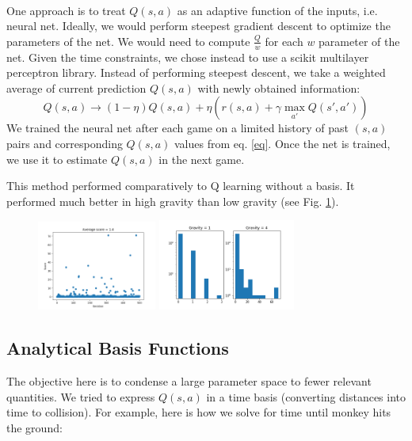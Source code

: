 \documentclass[11pt]{article}
\begin{document}
\paragraph{}One approach is to treat $Q(s,a)$ as an adaptive function of the inputs, i.e. neural net. Ideally, we would perform steepest gradient descent to optimize the parameters of the net. We would need to compute $\frac{Q}{w}$ for each $w$ parameter of the net. Given the time constraints, we chose instead to use a scikit multilayer perceptron library. Instead of performing steepest descent, we take a weighted average of current prediction $Q(s,a)$ with newly obtained information:
\begin{equation}Q(s,a)\rightarrow(1-\eta)Q(s,a)+\eta(r(s,a)+\gamma\max_{a'}Q(s',a'))\label{eq}\end{equation}
We trained the neural net after each game on a limited history of past $(s,a)$ pairs and corresponding $Q(s,a)$ values from eq. \ref{eq}. Once the net is trained, we use it to estimate $Q(s,a)$ in the next game.

This method performed comparatively to Q learning without a basis. It performed much better in high gravity than low gravity (see Fig. \ref{nn}).

\begin{figure}[] 
\centering
        \includegraphics[width=0.35\textwidth]{NN_plots/NN_layers_5_5_eps_0_g_0_6_iter_500.png}
        \includegraphics[width=0.4\textwidth]{NN_plots/NN_layers_5_5_eps_0_g_0_6_iter_500_histograms.png}
        \caption{}
            \label{nn}
\end{figure}



\subsection{Analytical Basis Functions} 
The objective here is to condense a large parameter space to fewer relevant quantities. We tried to express $Q(s,a)$ in a time basis (converting distances into time to collision). For example, here is how we solve for time until monkey hits the ground:
\end{document}
